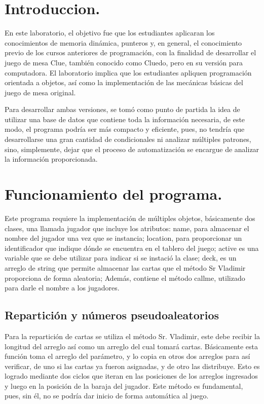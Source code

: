 \tableofcontents
\listoffigures
\newpage

\section{Introduccion.}
	En este laboratorio, el objetivo fue que los estudiantes aplicaran los conocimientos
de memoria dinámica, punteros y, en general, el conocimiento previo de los cursos anteriores
de programación, con la finalidad de desarrollar el juego de mesa Clue, también conocido como
Cluedo, pero en su versión para computadora. El laboratorio implica que los estudiantes apliquen
programación orientada a objetos, así como la implementación de las mecánicas básicas del juego
de mesa original.

Para desarrollar ambas versiones, se tomó como punto de partida la idea de utilizar
una base de datos que contiene toda la información necesaria, de este modo, el programa
podría ser más compacto y eficiente, pues, no tendría que desarrollarse una gran cantidad de
condicionales ni analizar múltiples patrones, sino, simplemente, dejar que el proceso de
automatización se encargue de analizar la información proporcionada.
\section{Funcionamiento del programa.}

	Este programa requiere la implementación de múltiples objetos, básicamente dos clases,
una llamada jugador que incluye los atributos: name, para almacenar el nombre del jugador una 
vez que se instancia; location, para proporcionar un identificador que indique dónde se encuentra
en el tablero del juego; active es una variable que se debe utilizar para indicar si se instació
la clase; deck, es un arreglo de string que permite almacenar las cartas que el método Sr Vladimir
proporciona de forma aleatoria; Además, contiene el método callme, utilizado para darle el 
nombre a los jugadores.

\subsection{Repartición y números pseudoaleatorios}

	Para la repartición de cartas se utiliza el método Sr. Vladimir, este debe recibir la
longitud del arreglo así como un arreglo del cual tomará cartas. Básicamente esta función toma
el arreglo del parámetro, y lo copia en otros dos arreglos para así verificar, de uno si las 
cartas ya fueron asignadas, y de otro las distribuye. Esto es logrado mediante dos ciclos que
iteran en las posiciones de los arreglos ingresados y luego en la posición de la baraja del 
jugador. Este método es fundamental, pues, sin él, no se podría dar inicio de forma automática
al juego.
	
